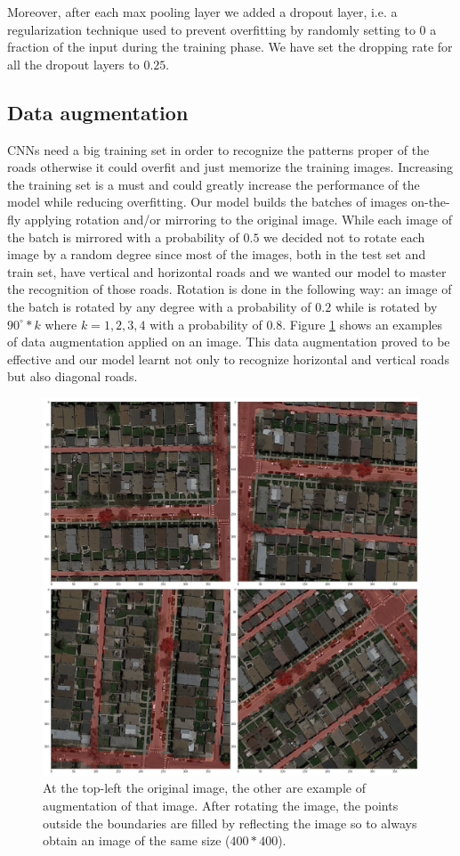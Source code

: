 \documentclass[10pt,conference,compsocconf]{IEEEtran}
\begin{document}
Moreover, after each max pooling layer we added a dropout layer, i.e. a regularization technique used to prevent overfitting by randomly setting to 0 a fraction of the input during the training phase. We have set the dropping rate for all the dropout layers to $0.25$.

\subsection{Data augmentation}
CNNs need a big training set in order to recognize the patterns proper of the roads otherwise it could overfit and just memorize the training images. Increasing the training set is a must and could greatly increase the performance of the model while reducing overfitting. Our model builds the batches of images on-the-fly applying rotation and/or mirroring to the original image. While each image of the batch is mirrored with a probability of $0.5$ we decided not to rotate each image by a random degree since most of the images, both in the test set and train set, have vertical and horizontal roads and we wanted our model to master the recognition of those roads. Rotation is done in the following way: an image of the batch is rotated by any degree with a probability of $0.2$ while is rotated by $90^\circ*k$ where $k=1,2,3,4$ with a probability of $0.8$. Figure \ref{fig:data-augmentation} shows an examples of data augmentation applied on an image. This data augmentation proved to be effective and our model learnt not only to recognize horizontal and vertical roads but also diagonal roads.
\begin{figure}[tbp]
	\centering
	\includegraphics[width=0.8\columnwidth]{img/data_augmentation.png}
	\caption{At the top-left the original image, the other are example of augmentation of that image. After rotating the image, the points outside the boundaries are filled by reflecting the image so to always obtain an image of the same size ($400*400$).}
	\vspace{-3mm}
	\label{fig:data-augmentation}
\end{figure}
\end{document}
